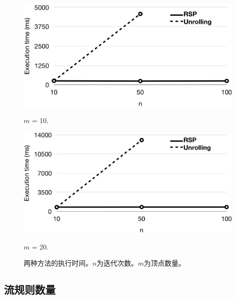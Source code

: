 \begin{figure}[!htbp]
    \centering
    \begin{minipage}{0.35\linewidth}
        \centering\includegraphics[width=\linewidth]{figures/lp-70.png}
        \caption{\label{fig:eval1-a} \small $m$ = 10.}
    \end{minipage}
    \hspace{0.03\linewidth}
    \begin{minipage}{0.35\linewidth}
        \centering\includegraphics[width=\linewidth]{figures/lp-71.png}
        \caption{\label{fig:eval1-b} \small $m$ = 20.}
    \end{minipage}
    \vspace{-2mm}
    \caption{\small 两种方法的执行时间。$n$为迭代次数。$m$为顶点数量。}
    \label{fig:eval1}
\end{figure}

\subsection{流规则数量}

